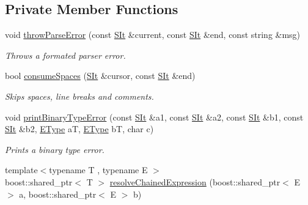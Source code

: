 \subsection*{Private Member Functions}
\begin{DoxyCompactItemize}
\item 
void \hyperlink{classgiskard__suturo_1_1GiskardLangParser_a0b36b25a5b037b43fc813a94e26bab81}{throw\-Parse\-Error} (const \hyperlink{classgiskard__suturo_1_1GiskardLangParser_aaebad1dc1afc92c7bdc1aa7e4d679621}{S\-It} \&current, const \hyperlink{classgiskard__suturo_1_1GiskardLangParser_aaebad1dc1afc92c7bdc1aa7e4d679621}{S\-It} \&end, const string \&msg)
\begin{DoxyCompactList}\small\item\em Throws a formated parser error. \end{DoxyCompactList}\item 
bool \hyperlink{classgiskard__suturo_1_1GiskardLangParser_a04dc73593642a727922e155f7f50ce44}{consume\-Spaces} (\hyperlink{classgiskard__suturo_1_1GiskardLangParser_aaebad1dc1afc92c7bdc1aa7e4d679621}{S\-It} \&cursor, const \hyperlink{classgiskard__suturo_1_1GiskardLangParser_aaebad1dc1afc92c7bdc1aa7e4d679621}{S\-It} \&end)
\begin{DoxyCompactList}\small\item\em Skips spaces, line breaks and comments. \end{DoxyCompactList}\item 
void \hyperlink{classgiskard__suturo_1_1GiskardLangParser_a2c311408f1ee48cc8d3330a32335970c}{print\-Binary\-Type\-Error} (const \hyperlink{classgiskard__suturo_1_1GiskardLangParser_aaebad1dc1afc92c7bdc1aa7e4d679621}{S\-It} \&a1, const \hyperlink{classgiskard__suturo_1_1GiskardLangParser_aaebad1dc1afc92c7bdc1aa7e4d679621}{S\-It} \&a2, const \hyperlink{classgiskard__suturo_1_1GiskardLangParser_aaebad1dc1afc92c7bdc1aa7e4d679621}{S\-It} \&b1, const \hyperlink{classgiskard__suturo_1_1GiskardLangParser_aaebad1dc1afc92c7bdc1aa7e4d679621}{S\-It} \&b2, \hyperlink{classgiskard__suturo_1_1GiskardLangParser_adbdbadf4ee4e2afb358b4ff98bf7daa2}{E\-Type} a\-T, \hyperlink{classgiskard__suturo_1_1GiskardLangParser_adbdbadf4ee4e2afb358b4ff98bf7daa2}{E\-Type} b\-T, char c)
\begin{DoxyCompactList}\small\item\em Prints a binary type error. \end{DoxyCompactList}\item 
{\footnotesize template$<$typename T , typename E $>$ }\\boost\-::shared\-\_\-ptr$<$ T $>$ \hyperlink{classgiskard__suturo_1_1GiskardLangParser_ab82a8c1a1e114a7d3a57295da29459c1}{resolve\-Chained\-Expression} (boost\-::shared\-\_\-ptr$<$ E $>$ a, boost\-::shared\-\_\-ptr$<$ E $>$ b)

\end{DoxyCompactItemize}

